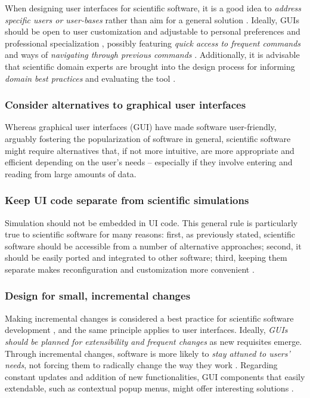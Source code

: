 When designing user interfaces for scientific software, it is a good idea to \emph{address specific users or user-bases} rather than aim for a general solution \cite {Javahery:2004, DeRoure:2009}. Ideally, GUIs should be open to user customization and adjustable to personal preferences and professional specialization \cite{Gertz:1994, Javahery:2004}, possibly featuring \emph{quick access to frequent commands} \cite{Julvez:2014} and ways of \emph{navigating through previous commands} \cite{bestprSC}. 
Additionally, it is advisable that scientific domain experts are brought into the design process for informing \emph{domain best practices} \cite{Schraefel:2004,  DeMatos:2013} and evaluating the tool \cite{Keefe:2010}.

\subsubsection{Consider alternatives to graphical user interfaces}

Whereas graphical user interfaces (GUI) have made software user-friendly, arguably fostering the popularization of software in general, scientific software might require alternatives that, if not more intuitive, are more appropriate and efficient depending on the user's needs – especially if they involve entering and reading from large amounts of data. 
 

\subsubsection{Keep UI code separate from scientific simulations}
Simulation should not be embedded in UI code. This general rule is particularly true to scientific software for many reasons: first, as previously stated, scientific software should be accessible from a number of alternative approaches; second, it should be easily ported and integrated to other software; third, keeping them separate makes reconfiguration and customization more convenient \cite{Bastos:2013}.

\subsubsection{Design for small, incremental changes}
Making incremental changes is considered a best practice for scientific software development  \cite{bestprSC}, and the same principle applies to user interfaces. Ideally, \emph{GUIs should be planned for extensibility and frequent changes} as new requisites emerge. Through incremental changes, software is more likely to \emph{stay attuned to users' needs}, not forcing them to radically change the way they work \cite{DeRoure:2009}. Regarding constant updates and addition of new functionalities, GUI components that easily extendable, such as contextual popup menus, might offer interesting solutions \cite{MacLeod:1992}. 

